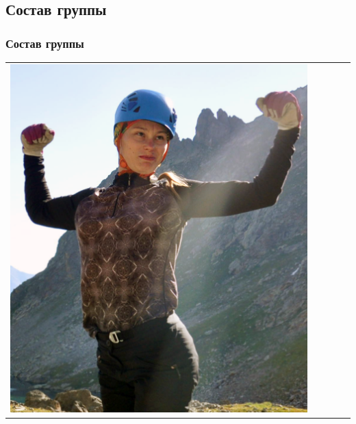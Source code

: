 \documentclass[
11pt, %
]{beamer}
\newcommand\rozhasize{0.17\textwidth}
\begin{document}
	\subsection{Состав группы}

\begin{frame}
	\frametitle{Состав группы}
	\begin{tabular}{ccccc}
	\begin{minipage}{\rozhasize}
		\includegraphics[width=\textwidth]{../pics/portraits/dasha_s}
	\end{minipage} &
	\begin{minipage}{\rozhasize}

\end{minipage}
\end{tabular}
\end{frame}
\end{document}
